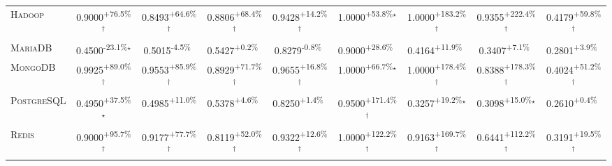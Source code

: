 \begin{table}[htbp]
\begin{tabular}{l|cccc|cccc}
\textsc{Hadoop} & \cellcolor{green!30}0.9000\textsuperscript{+76.5\%}$^\dagger$ & \cellcolor{green!30}0.8493\textsuperscript{+64.6\%}$^\dagger$ & \cellcolor{green!30}0.8806\textsuperscript{+68.4\%}$^\dagger$ & \cellcolor{green!30}0.9428\textsuperscript{+14.2\%}$^\dagger$ & \cellcolor{green!30}1.0000\textsuperscript{+53.8\%}$^\star$ & \cellcolor{green!30}1.0000\textsuperscript{+183.2\%}$^\dagger$ & \cellcolor{green!30}0.9355\textsuperscript{+222.4\%}$^\dagger$ & \cellcolor{green!30}0.4179\textsuperscript{+59.8\%}$^\dagger$ \\
\textsc{MariaDB} & \cellcolor{red!30}0.4500\textsuperscript{-23.1\%}$^\star$ & \cellcolor{red!30}0.5015\textsuperscript{-4.5\%}$^{\,\,\,}$ & \cellcolor{green!30}0.5427\textsuperscript{+0.2\%}$^{\,\,\,}$ & \cellcolor{red!30}0.8279\textsuperscript{-0.8\%}$^{\,\,\,}$ & \cellcolor{green!30}0.9000\textsuperscript{+28.6\%}$^{\,\,\,}$ & \cellcolor{green!30}0.4164\textsuperscript{+11.9\%}$^{\,\,\,}$ & \cellcolor{green!30}0.3407\textsuperscript{+7.1\%}$^{\,\,\,}$ & \cellcolor{green!30}0.2801\textsuperscript{+3.9\%}$^{\,\,\,}$ \\
\textsc{MongoDB} & \cellcolor{green!30}0.9925\textsuperscript{+89.0\%}$^\dagger$ & \cellcolor{green!30}0.9553\textsuperscript{+85.9\%}$^\dagger$ & \cellcolor{green!30}0.8929\textsuperscript{+71.7\%}$^\dagger$ & \cellcolor{green!30}0.9655\textsuperscript{+16.8\%}$^\dagger$ & \cellcolor{green!30}1.0000\textsuperscript{+66.7\%}$^\star$ & \cellcolor{green!30}1.0000\textsuperscript{+178.4\%}$^\dagger$ & \cellcolor{green!30}0.8388\textsuperscript{+178.3\%}$^\dagger$ & \cellcolor{green!30}0.4024\textsuperscript{+51.2\%}$^\dagger$ \\
\textsc{PostgreSQL} & \cellcolor{green!30}0.4950\textsuperscript{+37.5\%}$^\star$ & \cellcolor{green!30}0.4985\textsuperscript{+11.0\%}$^{\,\,\,}$ & \cellcolor{green!30}0.5378\textsuperscript{+4.6\%}$^{\,\,\,}$ & \cellcolor{green!30}0.8250\textsuperscript{+1.4\%}$^{\,\,\,}$ & \cellcolor{green!30}0.9500\textsuperscript{+171.4\%}$^\dagger$ & \cellcolor{green!30}0.3257\textsuperscript{+19.2\%}$^\star$ & \cellcolor{green!30}0.3098\textsuperscript{+15.0\%}$^\star$ & \cellcolor{green!30}0.2610\textsuperscript{+0.4\%}$^{\,\,\,}$ \\
\textsc{Redis} & \cellcolor{green!30}0.9000\textsuperscript{+95.7\%}$^\dagger$ & \cellcolor{green!30}0.9177\textsuperscript{+77.7\%}$^\dagger$ & \cellcolor{green!30}0.8119\textsuperscript{+52.0\%}$^\dagger$ & \cellcolor{green!30}0.9322\textsuperscript{+12.6\%}$^\dagger$ & \cellcolor{green!30}1.0000\textsuperscript{+122.2\%}$^\dagger$ & \cellcolor{green!30}0.9163\textsuperscript{+169.7\%}$^\dagger$ & \cellcolor{green!30}0.6441\textsuperscript{+112.2\%}$^\dagger$ & \cellcolor{green!30}0.3191\textsuperscript{+19.5\%}$^\dagger$ \\

\end{tabular}
\end{table}
